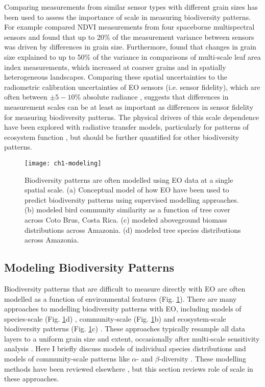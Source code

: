 Comparing measurements from similar sensor types with different grain sizes has been used to assess the importance of scale in measuring biodiversity patterns. For example \cite{Brown2006-pu} compared NDVI measurements from four spaceborne multispectral sensors and found that up to 20\% of the measurement variance between sensors was driven by differences in grain size. Furthermore, \cite{Garrigues2006-mp} found that changes in grain size explained to up to 50\% of the variance in comparisons of multi‐scale leaf area index measurements, which increased at coarser grains and in spatially heterogeneous landscapes. Comparing these spatial uncertainties to the radiometric calibration uncertainties of EO sensors (i.e. sensor fidelity), which are often between $\pm 5-10\%$ absolute radiance \cite{Chander2009-cn}, suggests that differences in measurement scales can be at least as important as differences in sensor fidelity for measuring biodiversity patterns. The physical drivers of this scale dependence have been explored with radiative transfer models, particularly for patterns of ecosystem function \cite{asner1998scale, jacquemoud2009prospect+}, but should be further quantified for other biodiversity patterns.

\begin{figure}[!ht]
\texttt{[image: ch1-modeling]}
\centering
\caption[Conceptual synthesis of how biodiversity patterns have been modelled using EO data at a single spatial scale.]{Biodiversity patterns are often modelled using EO data at a single spatial scale. (a) Conceptual model of how EO have been used to predict biodiversity patterns using supervised modelling approaches. (b) \cite{Mendenhall2011-mu} modeled bird community similarity as a function of tree cover across Coto Brus, Costa Rica. (c) \cite{Saatchi2007-sc} modeled aboveground biomass distributions across Amazonia. (d) \cite{Saatchi2008-jq} modeled tree species distributions across Amazonia.}
\label{fig:modeling}
\end{figure}

\subsection{Modeling Biodiversity Patterns}

Biodiversity patterns that are difficult to measure directly with EO are often modelled as a function of environmental features (Fig. \ref{fig:modeling}). There are many approaches to modelling biodiversity patterns with EO, including models of species‐scale (Fig. \ref{fig:modeling}d) \cite{Saatchi2008-jq}, community‐scale (Fig. \ref{fig:modeling}b) \cite{Mendenhall2011-mu} and ecosystem‐scale biodiversity patterns (Fig. \ref{fig:modeling}c) \cite{Saatchi2007-sc}. These approaches typically resample all data layers to a uniform grain size and extent, occasionally after multi‐scale sensitivity analysis \cite{mcgarigal2016multi}. Here I briefly discuss models of individual species distributions \cite{Guisan2005-kg} and models of community‐scale patterns like $\alpha$- and $\beta$-diversity \cite{Rocchini2007-ew}. These modelling methods have been reviewed elsewhere \cite{Gillespie2008-gi, Rocchini2010-pe, Pettorelli2014-pn}, but this section reviews role of scale in these approaches.

